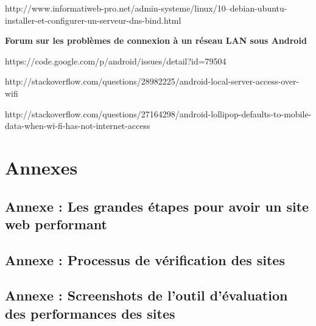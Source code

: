 \documentclass[report]{tnreport}
\begin{document}
http://www.informatiweb-pro.net/admin-systeme/linux/10--debian-ubuntu-installer-et-configurer-un-serveur-dns-bind.html

\textbf{Forum sur les problèmes de connexion à un réseau LAN sous Android}


https://code.google.com/p/android/issues/detail?id=79504


http://stackoverflow.com/questions/28982225/android-local-server-access-over-wifi


http://stackoverflow.com/questions/27164298/android-lollipop-defaults-to-mobile-data-when-wi-fi-has-not-internet-access


\cleardoublepage
\renewcommand{\thesubsection}{\Roman{subsection}}

\appendix
\part*{Annexes}
\cleardoublepage

\chapter{Annexe : Les grandes étapes pour avoir un site web performant}


\chapter{Annexe : Processus de vérification des sites}


\chapter{Annexe : Screenshots de l'outil d'évaluation des performances des sites}
\end{document}

